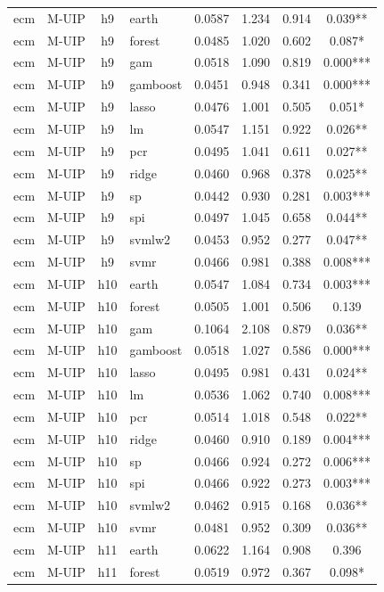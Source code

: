 \begin{ThreePartTable}
\begin{longtable}[t]{llclcccc}
\addlinespace
ecm & M-UIP & h9 & earth & 0.0587 & 1.234 & 0.914 & 0.039**\\
ecm & M-UIP & h9 & forest & 0.0485 & 1.020 & 0.602 & 0.087*\\
ecm & M-UIP & h9 & gam & 0.0518 & 1.090 & 0.819 & 0.000***\\
ecm & M-UIP & h9 & gamboost & 0.0451 & 0.948 & 0.341 & 0.000***\\
ecm & M-UIP & h9 & lasso & 0.0476 & 1.001 & 0.505 & 0.051*\\
ecm & M-UIP & h9 & lm & 0.0547 & 1.151 & 0.922 & 0.026**\\
ecm & M-UIP & h9 & pcr & 0.0495 & 1.041 & 0.611 & 0.027**\\
ecm & M-UIP & h9 & ridge & 0.0460 & 0.968 & 0.378 & 0.025**\\
ecm & M-UIP & h9 & sp & 0.0442 & 0.930 & 0.281 & 0.003***\\
ecm & M-UIP & h9 & spi & 0.0497 & 1.045 & 0.658 & 0.044**\\
ecm & M-UIP & h9 & svmlw2 & 0.0453 & 0.952 & 0.277 & 0.047**\\
ecm & M-UIP & h9 & svmr & 0.0466 & 0.981 & 0.388 & 0.008***\\
\addlinespace
ecm & M-UIP & h10 & earth & 0.0547 & 1.084 & 0.734 & 0.003***\\
ecm & M-UIP & h10 & forest & 0.0505 & 1.001 & 0.506 & 0.139\\
ecm & M-UIP & h10 & gam & 0.1064 & 2.108 & 0.879 & 0.036**\\
ecm & M-UIP & h10 & gamboost & 0.0518 & 1.027 & 0.586 & 0.000***\\
ecm & M-UIP & h10 & lasso & 0.0495 & 0.981 & 0.431 & 0.024**\\
ecm & M-UIP & h10 & lm & 0.0536 & 1.062 & 0.740 & 0.008***\\
ecm & M-UIP & h10 & pcr & 0.0514 & 1.018 & 0.548 & 0.022**\\
ecm & M-UIP & h10 & ridge & 0.0460 & 0.910 & 0.189 & 0.004***\\
ecm & M-UIP & h10 & sp & 0.0466 & 0.924 & 0.272 & 0.006***\\
ecm & M-UIP & h10 & spi & 0.0466 & 0.922 & 0.273 & 0.003***\\
ecm & M-UIP & h10 & svmlw2 & 0.0462 & 0.915 & 0.168 & 0.036**\\
ecm & M-UIP & h10 & svmr & 0.0481 & 0.952 & 0.309 & 0.036**\\
\addlinespace
ecm & M-UIP & h11 & earth & 0.0622 & 1.164 & 0.908 & 0.396\\
ecm & M-UIP & h11 & forest & 0.0519 & 0.972 & 0.367 & 0.098*\\

\end{longtable}
\end{ThreePartTable}
